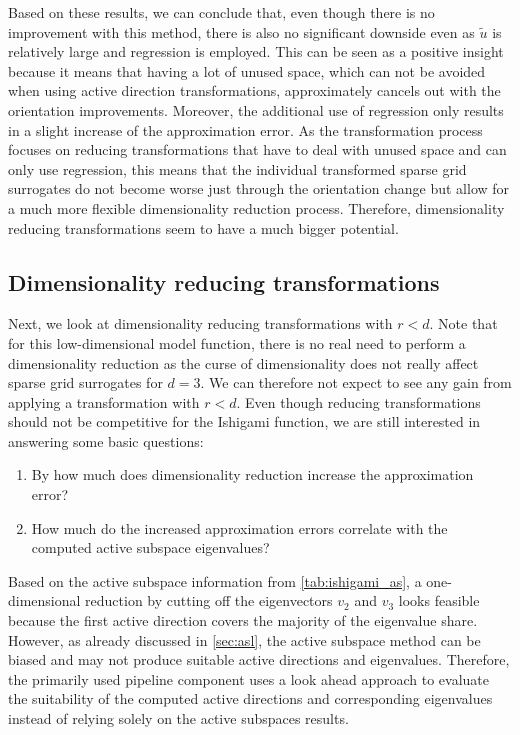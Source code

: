 \documentclass[
  a4paper,  %
  twoside,  %
  bibliography=totoc,
  headsepline,
  cleardoublepage=empty,
  parskip=half,
  draft=false
]{scrbook}
\begin{document}
Based on these results, we can conclude that, even though there is no improvement with this method, there is also no significant downside even as $\tilde{u}$ is relatively large and regression is employed.
This can be seen as a positive insight because it means that having a lot of unused space, which can not be avoided when using active direction transformations, approximately cancels out with the orientation improvements.
Moreover, the additional use of regression only results in a slight increase of the approximation error.
As the transformation process focuses on reducing transformations that have to deal with unused space and can only use regression, this means that the individual transformed sparse grid surrogates do not become worse just through the orientation change but allow for a much more flexible dimensionality reduction process.
Therefore, dimensionality reducing transformations seem to have a much bigger potential.

\subsection{Dimensionality reducing transformations}

Next, we look at dimensionality reducing transformations with $r < d$.
Note that for this low-dimensional model function, there is no real need to perform a dimensionality reduction as the curse of dimensionality does not really affect sparse grid surrogates for $d=3$.
We can therefore not expect to see any gain from applying a transformation with $r < d$.
Even though reducing transformations should not be competitive for the Ishigami function, we are still interested in answering some basic questions:
\begin{enumerate}
\item By how much does dimensionality reduction increase the approximation error?
\item How much do the increased approximation errors correlate with the computed active subspace eigenvalues?
\end{enumerate}
%
Based on the active subspace information from \cref{tab:ishigami_as}, a one-dimensional reduction by cutting off the eigenvectors $v_2$ and $v_3$ looks feasible because the first active direction covers the majority of the eigenvalue share.
However, as already discussed in \cref{sec:asl}, the active subspace method can be biased and may not produce suitable active directions and eigenvalues.
Therefore, the primarily used pipeline component uses a look ahead approach to evaluate the suitability of the computed active directions and corresponding eigenvalues instead of relying solely on the active subspaces results.
\end{document}
